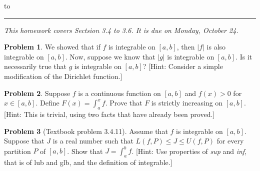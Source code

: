\documentclass[12pt]{article}
\theoremstyle{definition}
\newtheorem{problem}{Problem}
\newenvironment{answer}{\par\medskip\bgroup\color{darkblue}}{\egroup\medskip}
\begin{document}
\hbox to 
\nointerlineskip
\vskip 2pt
\hrule height 1pt

\medskip

\centerline{\textit{This homework covers Sectsion 3.4 to 3.6.  It is due on Monday, October 24.}}

\bigskip

\def\ds{\displaystyle}


\begin{problem}  %
We showed that if $f$ is integrable on $[a,b]$, then $|f|$ is also integrable on $[a,b]$.
Now, suppose we know that $|g|$ is integrable on $[a,b]$.  Is it necessarily true
that $g$ is integrable on $[a,b]$?  [Hint: Consider a simple modification of the
Dirichlet function.]
\end{problem}

\begin{answer}
\end{answer}




\begin{problem}  %
Suppose $f$ is a continuous function on $[a,b]$ and $f(x)>0$ for $x\in[a,b]$.
Define $F(x)=\int_a^xf$.  Prove that $F$ is strictly increasing on $[a,b]$.
[Hint: This is trivial, using two facts that have already been proved.]
\end{problem}

\begin{answer}
\end{answer}




\begin{problem} %
[Textbook problem 3.4.11]
Assume that $f$ is integrable on $[a,b]$.  Suppose that $J$ is a real number such that
$L(f,P)\le J \le U(f,P)$ for every partition $P$ of $[a,b]$.  Show that $J=\int_a^b f$.
[Hint: Use properties of \textit{sup} and \textit{inf}, that is of lub and glb, 
and the definition of integrable.]
\end{problem}

\begin{answer}
\end{answer}
\end{document}
